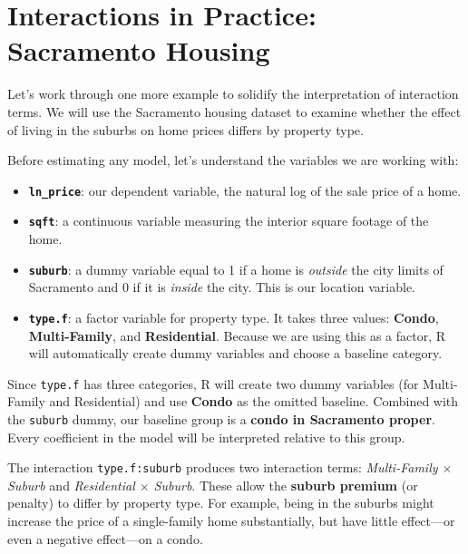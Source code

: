 \documentclass[
  letterpaper,
  DIV=11,
  numbers=noendperiod]{scrreprt}
\providecommand{\tightlist}{%
  \setlength{\itemsep}{0pt}\setlength{\parskip}{0pt}}
\begin{document}
\section{Interactions in Practice: Sacramento
Housing}\label{interactions-in-practice-sacramento-housing}

Let's work through one more example to solidify the interpretation of
interaction terms. We will use the Sacramento housing dataset to examine
whether the effect of living in the suburbs on home prices differs by
property type.

Before estimating any model, let's understand the variables we are
working with:

\begin{itemize}
\tightlist
\item
  \textbf{\texttt{ln\_price}}: our dependent variable, the natural log
  of the sale price of a home.
\item
  \textbf{\texttt{sqft}}: a continuous variable measuring the interior
  square footage of the home.
\item
  \textbf{\texttt{suburb}}: a dummy variable equal to 1 if a home is
  \emph{outside} the city limits of Sacramento and 0 if it is
  \emph{inside} the city. This is our location variable.
\item
  \textbf{\texttt{type.f}}: a factor variable for property type. It
  takes three values: \textbf{Condo}, \textbf{Multi-Family}, and
  \textbf{Residential}. Because we are using this as a factor, R will
  automatically create dummy variables and choose a baseline category.
\end{itemize}

Since \texttt{type.f} has three categories, R will create two dummy
variables (for Multi-Family and Residential) and use \textbf{Condo} as
the omitted baseline. Combined with the \texttt{suburb} dummy, our
baseline group is a \textbf{condo in Sacramento proper}. Every
coefficient in the model will be interpreted relative to this group.

The interaction \texttt{type.f:suburb} produces two interaction terms:
\emph{Multi-Family \(\times\) Suburb} and \emph{Residential \(\times\)
Suburb}. These allow the \textbf{suburb premium} (or penalty) to differ
by property type. For example, being in the suburbs might increase the
price of a single-family home substantially, but have little effect---or
even a negative effect---on a condo.
\end{document}

